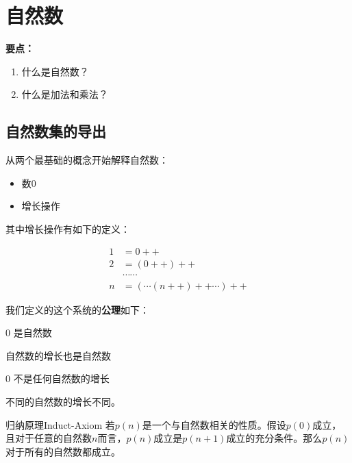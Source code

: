 \section{自然数}

\noindent\textbf{要点：}
\begin{enumerate}
	\item 什么是自然数？
	\item 什么是加法和乘法？
\end{enumerate}

\subsection{自然数集的导出}

从两个最基础的概念开始解释自然数：

\begin{itemize}
	\item 数$0$
	\item 增长操作
\end{itemize}

其中增长操作有如下的定义：

$$
\begin{aligned}
	1&=0++\\
	2&=(0++)++\\
	&\cdots\cdots\\
	n&=(\cdots(n++)++\cdots)++
\end{aligned}
$$

我们定义的这个系统的\textbf{公理}如下：

\begin{axiom}{}{}
	$0$ 是自然数
\end{axiom}

\begin{axiom}{}{}
	自然数的增长也是自然数
\end{axiom}

\begin{axiom}{}{}
	$0$ 不是任何自然数的增长
\end{axiom}

\begin{axiom}{}{}
	不同的自然数的增长不同。
\end{axiom}

\begin{axiom}{归纳原理}{Induct-Axiom}
	若$p(n)$是一个与自然数相关的性质。假设$p(0)$成立，且对于任意的自然数$n$而言，$p(n)$成立是$p(n+1)$成立的充分条件。那么$p(n)$对于所有的自然数都成立。
\end{axiom}

